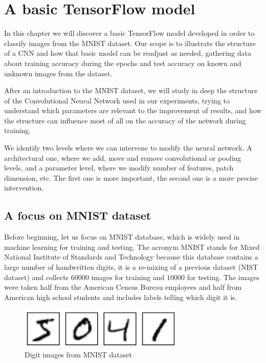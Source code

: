 \chapter{A basic TensorFlow model}\label{ch:basic_tf_model}

In this chapter we will discover a basic TensorFlow model developed in order to classify images from the MNIST dataset. Our scope is to illustrate the structure of a \acs{CNN} and how that basic model can be readjust as needed, gathering data about training accuracy during the epochs and test accuracy on known and unknown images from the dataset.

After an introduction to the MNIST dataset, we will study in deep the structure of the Convolutional Neural Network used in our experiments, trying to understand which parameters are relevant to the improvement of results, and how the structure can influence most of all on the accuracy of the network during training.

We identify two levels where we can intervene to modify the neural network. A architectural one, where we add, move and remove convolutional or pooling levels, and a parameter level, where we modify number of features, patch dimension, etc. The first one is more important, the second one is a more precise intervention.

\section{A focus on MNIST dataset}

Before beginning, let us focus on MNIST database, which is widely used in machine learning for training and testing. The acronym MNIST stands for Mixed National Institute of Standards and Technology because this database contains a large number of handwritten digits, it is a re-mixing of a previous dataset (NIST dataset) and collects $60000$ images for training and $10000$ for testing. The images were taken half from the American Census Bureau employees and half from American high school students and includes labels telling which digit it is.

\begin{figure}
	\centering
	\includegraphics[width=0.7\textwidth]{Images/MNIST_images}
	\caption{Digit images from MNIST dataset}
	\label{fig:MNIST_images}
\end{figure}

